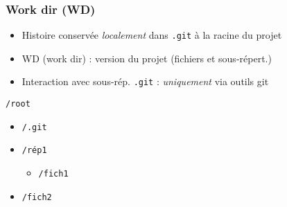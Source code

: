 \documentclass[english, french]{beamer}
\begin{document}
\begin{frame}
	\frametitle{Work dir (WD)}
	\begin{itemize}
		\item Histoire conservée \emph{localement} dans \texttt{.git} à la racine du projet
		\item WD (\og{}work dir\fg{}) : version du projet (fichiers et sous-répert.)
		\item Interaction avec sous-rép. \texttt{.git} : \emph{uniquement} via outils git
	\end{itemize}
	\texttt{/root}
	\begin{itemize}
		\item[] \texttt{/.git}
		\item[] \texttt{/rép1}
		\begin{itemize}
			\item[] \texttt{/fich1}
		\end{itemize}\vspace{-0.8ex}
		\item[] \texttt{/fich2}
	\end{itemize}
\end{frame}
\end{document}

